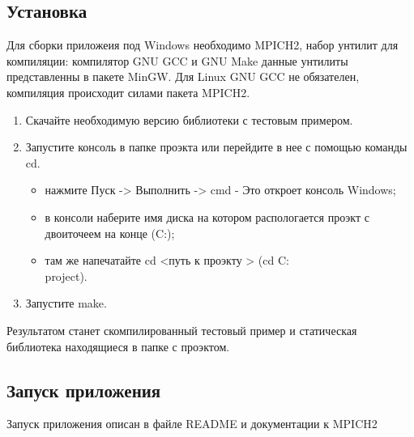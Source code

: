 \subsection{Установка}
Для сборки приложеия под Windows необходимо MPICH2, набор унтилит для компиляции: компилятор GNU GCC и GNU Make данные унтилиты представленны в пакете MinGW. Для Linux GNU GCC не обязателен, компиляция происходит силами пакета MPICH2.
\begin{enumerate}
	\item Скачайте необходимую версию библиотеки с тестовым примером.
	\item Запустите консоль в папке проэкта или перейдите в нее с помощью команды cd.
	\begin{itemize}
		\item нажмите Пуск -> Выполнить -> cmd - Это откроет консоль Windows;
		\item в консоли наберите имя диска на котором распологается проэкт с двоиточеем на конце (C:);
		\item там же напечатайте cd <путь к проэкту > (cd C:\\project).
	\end{itemize}
	\item Запустите make.
\end{enumerate}
Результатом станет скомпилированный тестовый пример и статическая библиотека находящиеся в папке с проэктом.

\subsection{Запуск приложения}
Запуск приложения описан в файле README и документации к MPICH2 
